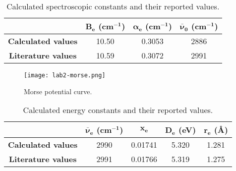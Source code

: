 \documentclass[../labs.tex]{subfiles}
\begin{document}
\begin{table}[H]
    \centering
    \small
    \renewcommand{\arraystretch}{1.2}
    \begin{tabular}{|c|c|c|c|}
        \hline
         & $\bm{B_e}$ \textbf{(cm${}^{\bm{-1}}$)} & $\bm{\alpha_e}$ \textbf{(cm${}^{\bm{-1}}$)} & $\bm{\bar{\nu}_0}$ \textbf{(cm${}^{\bm{-1}}$)}\\ %
        \hline
        \textbf{Calculated values} & \num{10.50} & \num{0.3053} & \num{2886}\\ %
        \hline
        \textbf{Literature values} & \num{10.59}\supercite{bib:NISTDiatomics} & \num{0.3072}\supercite{bib:NISTDiatomics} & \num{2991}\supercite{bib:NISTDiatomics}\\ %
        \hline
    \end{tabular}
    \caption{Calculated spectroscopic constants and their reported values.}
    \label{tab:IRConstants}
\end{table}

\begin{figure}[H]
    \centering
    \texttt{[image: lab2-morse.png]}
    \caption{Morse potential curve.}
    \label{fig:morse}
\end{figure}

\begin{table}[H]
    \centering
    \small
    \renewcommand{\arraystretch}{1.2}
    \begin{tabular}{|c|c|c|c|c|}
        \hline
         & $\bm{\bar{\nu}_e}$ \textbf{(cm${}^{\bm{-1}}$)} & $\bm{x_e}$ & $\bm{D_e}$ \textbf{(eV)} & $\bm{r_e}$ \textbf{(\AA)}\\
        \hline
        \textbf{Calculated values} & \num{2990} & \num{0.01741} & \num{5.320} & \num{1.281}\\
        \hline
        \textbf{Literature values} & \num{2991}\supercite{bib:NISTDiatomics} & \num{0.01766}\supercite{bib:NISTDiatomics} & \num{5.319}\supercite{bib:NISTDiatomics} & \num{1.275}\supercite{bib:NISTDiatomics}\\
        \hline
    \end{tabular}
    \caption{Calculated energy constants and their reported values.}
    \label{tab:energyConstant}
\end{table}
\newpage


\printbibliography
\setcounter{figure}{0}
\setcounter{table}{0}
\end{document}
